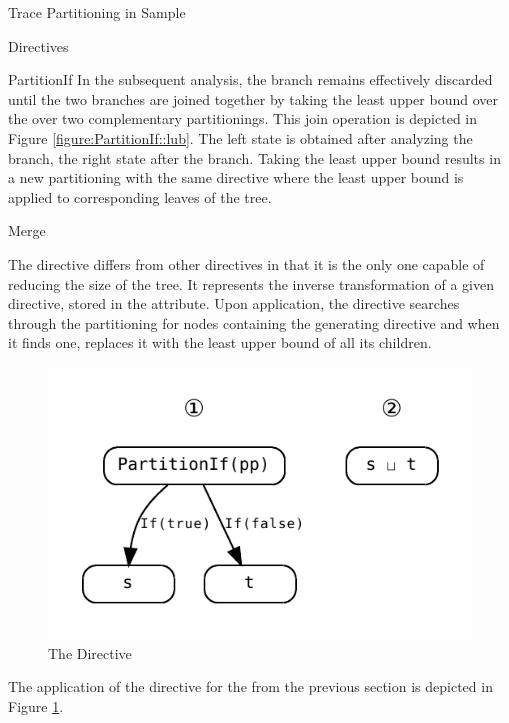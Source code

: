 \begin{chapter}{Trace Partitioning in Sample}
\begin{section}{Directives}
\begin{subsection}{PartitionIf}
			In the subsequent analysis, the  branch remains effectively discarded until the two branches are joined together by taking the least upper bound over the over two complementary partitionings. This join operation is depicted in Figure \ref{figure:PartitionIf::lub}. The left state  is obtained after analyzing the  branch, the right state  after the  branch. Taking the least upper bound results in a new partitioning with the same directive where the least upper bound is applied to corresponding leaves of the tree.

		\end{subsection}


		\begin{subsection}{Merge}
			\label{subsection:Merge}

			The  directive differs from other directives in that it is the only one capable of reducing the size of the tree. It represents the inverse transformation of a given directive, stored in the  attribute. Upon application, the directive searches through the partitioning for nodes containing the generating directive and when it finds one, replaces it with the least upper bound of all its children.

			\begin{figure}[h]
				\centering
				\includegraphics[]{Graphs/Merge.pdf}
				\caption{The  Directive}
				\label{figure:Merge}
			\end{figure}

			The application of the  directive for the  from the previous section is depicted in Figure \ref{figure:Merge}.
		\end{subsection}


\end{section}
\end{chapter}
